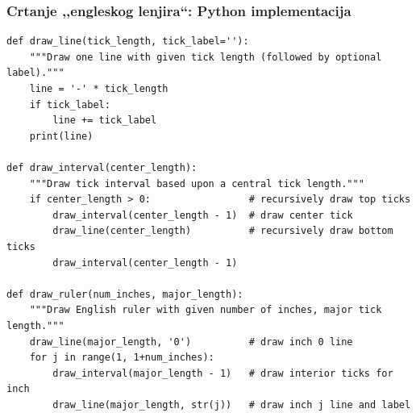 \documentclass[compress,aspectratio=169]{beamer}
\begin{document}
\begin{frame}[fragile,shrink=10]
  \frametitle{Crtanje ,,engleskog lenjira``: Python implementacija}
\begin{verbatim}
def draw_line(tick_length, tick_label=''):
    """Draw one line with given tick length (followed by optional label)."""
    line = '-' * tick_length
    if tick_label:
        line += tick_label
    print(line)

def draw_interval(center_length):
    """Draw tick interval based upon a central tick length."""
    if center_length > 0:                 # recursively draw top ticks
        draw_interval(center_length - 1)  # draw center tick
        draw_line(center_length)          # recursively draw bottom ticks
        draw_interval(center_length - 1)

def draw_ruler(num_inches, major_length):
    """Draw English ruler with given number of inches, major tick length."""
    draw_line(major_length, '0')          # draw inch 0 line
    for j in range(1, 1+num_inches):
        draw_interval(major_length - 1)   # draw interior ticks for inch
        draw_line(major_length, str(j))   # draw inch j line and label
\end{verbatim}  
\end{frame}
\end{document}
